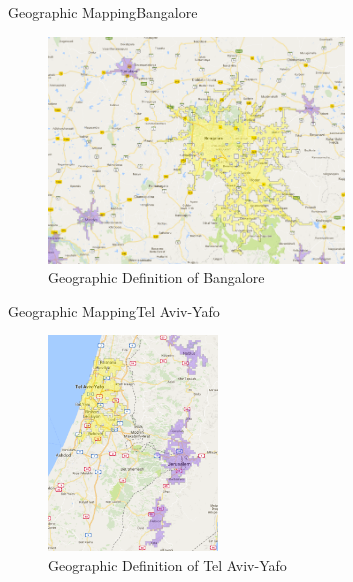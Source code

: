 \documentclass{beamer}
\begin{document}
\begin{frame}{Geographic Mapping}{Bangalore}
\begin{figure}[h!]
\begin{centering}
  \includegraphics[width=0.7\textwidth]{Bangalore}
  \caption{Geographic Definition of Bangalore}
   \label{fig:Bangalore}
\end{centering}
\end{figure}
\end{frame}

\begin{frame}{Geographic Mapping}{Tel Aviv-Yafo}
\begin{figure}[h!]
\begin{centering}
  \includegraphics[width=0.4\textwidth]{TelAviv}
  \caption{Geographic Definition of Tel Aviv-Yafo}
   \label{fig:TelAviv}
\end{centering}
\end{figure}
\end{frame}
\end{document}
